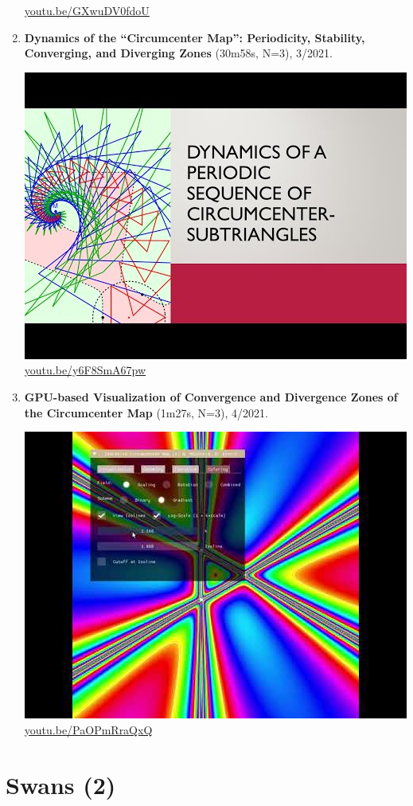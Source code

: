 \documentclass[12pt]{amsart}
\begin{document}
\begin{enumerate}[resume]
\begin{center}
\href{https://youtu.be/GXwuDV0fdoU}{\url{youtu.be/GXwuDV0fdoU}}\end{center}
% 
\item \textbf{Dynamics of the ``Circumcenter Map'': Periodicity, Stability, Converging, and Diverging Zones} (30m58s, N=3), 3/2021. 
\begin{center}\includegraphics[width=.5\textwidth]{pics/y6F8SmA67pw.jpg} \\ 
\href{https://youtu.be/y6F8SmA67pw}{\url{youtu.be/y6F8SmA67pw}}\end{center}
% 
\item \textbf{GPU-based Visualization of Convergence and Divergence Zones of the Circumcenter Map} (1m27s, N=3), 4/2021. 
\begin{center}\includegraphics[width=.5\textwidth]{pics/PaOPmRraQxQ.jpg} \\ 
\href{https://youtu.be/PaOPmRraQxQ}{\url{youtu.be/PaOPmRraQxQ}}\end{center}
% 
\end{enumerate}

\section{Swans (2)}
\end{document}
